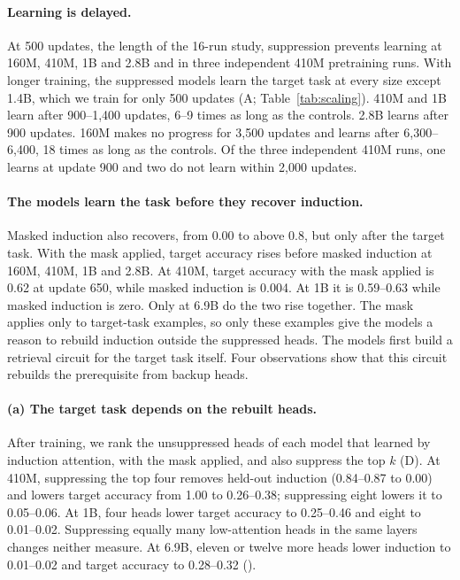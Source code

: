 \paragraph{Learning is delayed.}
At 500 updates, the length of the 16-run study, suppression prevents learning at
160M, 410M, 1B and 2.8B and in three independent 410M pretraining runs. With longer
training, the suppressed models learn the target task at every size except 1.4B,
which we train for only 500 updates (A; Table~\ref{tab:scaling}).
410M and 1B learn after 900--1,400 updates, 6--9 times as long as the controls. 2.8B
learns after 900 updates. 160M makes no progress for 3,500 updates and learns after
6,300--6,400, 18 times as long as the controls. Of the three independent 410M runs,
one learns at update 900 and two do not learn within 2,000 updates.

\paragraph{The models learn the task before they recover induction.}
Masked induction also recovers, from 0.00 to above 0.8, but only after the target
task. With the mask applied, target accuracy rises before masked induction at 160M,
410M, 1B and 2.8B. At 410M, target accuracy with the mask applied is 0.62 at update
650, while masked induction is 0.004. At 1B it is 0.59--0.63 while masked induction
is zero. Only at 6.9B do the two rise together. The mask applies only to target-task
examples, so only these examples give the models a reason to rebuild induction
outside the suppressed heads. The models first build a retrieval circuit for the
target task itself. Four observations show that this circuit rebuilds the
prerequisite from backup heads.

\paragraph{(a) The target task depends on the rebuilt heads.}
After training, we rank the unsuppressed heads of each model that learned by
induction attention, with the mask applied, and also suppress the top $k$
(D). At 410M, suppressing the top four removes held-out
induction (0.84--0.87 to 0.00) and lowers target accuracy from 1.00 to 0.26--0.38;
suppressing eight lowers it to 0.05--0.06. At 1B, four heads lower target accuracy
to 0.25--0.46 and eight to 0.01--0.02. Suppressing equally many low-attention heads
in the same layers changes neither measure. At 6.9B, eleven or twelve more heads
lower induction to 0.01--0.02 and target accuracy to 0.28--0.32
().

